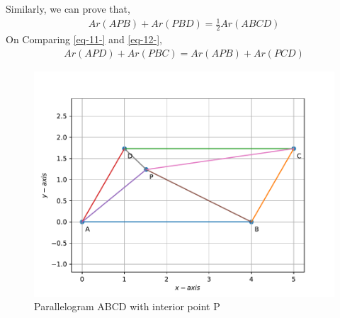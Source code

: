 \documentclass{article}
\begin{document}
Similarly, we can prove that,
\begin{align}
Ar(APB)+Ar(PBD) = \frac{1}{2}Ar(ABCD)
\label{eq-12-}
\end{align}
On Comparing \eqref{eq-11-} and \eqref{eq-12-},
\begin{align}
Ar(APD)+Ar(PBC) = Ar(APB)+Ar(PCD)
\label{eq-13-}
\end{align}

\begin{figure}[!ht]
	\begin{center}
		\includegraphics[width=\columnwidth]{figs/fig.pdf}
	\end{center}
	\caption{Parallelogram ABCD with interior point P}
\label{fig:Parallelogram}
\end{figure}
\end{document}
